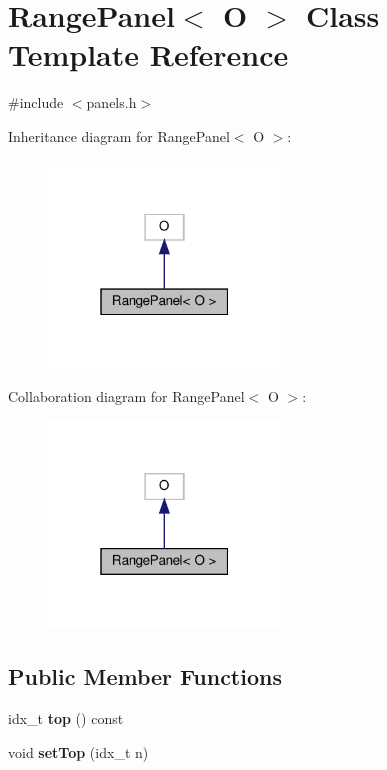 \hypertarget{classRangePanel}{}\section{Range\+Panel$<$ O $>$ Class Template Reference}
\label{classRangePanel}


{\ttfamily \#include $<$panels.\+h$>$}



Inheritance diagram for Range\+Panel$<$ O $>$\+:\nopagebreak
\begin{figure}[H]
\begin{center}
\leavevmode
\includegraphics[width=175pt]{classRangePanel__inherit__graph}
\end{center}
\end{figure}


Collaboration diagram for Range\+Panel$<$ O $>$\+:\nopagebreak
\begin{figure}[H]
\begin{center}
\leavevmode
\includegraphics[width=175pt]{classRangePanel__coll__graph}
\end{center}
\end{figure}
\subsection*{Public Member Functions}
\begin{DoxyCompactItemize}
\item 
\mbox{\label{classRangePanel_a6e9afb303bbe3f59bbc82363aa9642f9}} 
idx\+\_\+t {\bfseries top} () const
\item 
\mbox{\label{classRangePanel_aecc0841ba198f660e898f7c6e03f1aca}} 
void {\bfseries set\+Top} (idx\+\_\+t n)
\end{DoxyCompactItemize}
